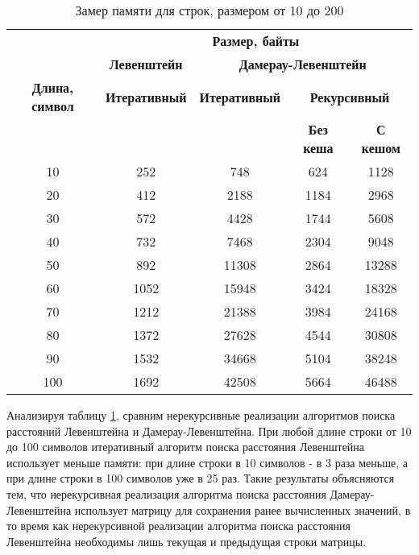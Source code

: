 \begin{table}[ht]
	\small
	\begin{center}
		\begin{threeparttable}
			\caption{Замер памяти для строк, размером от 10 до 200}
			\label{tbl:memory}
			\begin{tabular}{|c|c|c|c|c|}
				\hline
				& \multicolumn{4}{c|}{\bfseries Размер, байты} \\ \cline{2-5}
				& \multicolumn{1}{c|}{\bfseries Левенштейн}
				& \multicolumn{3}{c|}{\bfseries Дамерау-Левенштейн} \\ \cline{2-5}
				\bfseries Длина, символ & \bfseries Итеративный & \bfseries Итеративный & \multicolumn{2}{c|}{\bfseries Рекурсивный} \\ \cline{4-5}
				& & & \bfseries Без кеша & \bfseries С кешом \\
				\hline
				10 & 252 & 748 & 624 & 1128 \\
				\hline
				20 & 412 & 2188 & 1184 & 2968 \\
				\hline
				30 & 572 & 4428 & 1744 & 5608 \\
				\hline
				40 & 732 & 7468 & 2304 & 9048 \\
				\hline
				50 & 892 & 11308 & 2864 & 13288 \\
				\hline
				60 &  1052 & 15948 & 3424 & 18328 \\
				\hline
				70 & 1212 & 21388 & 3984 & 24168 \\
				\hline
				80 &1372 & 27628 & 4544 & 30808 \\
				\hline
				90 & 1532 & 34668 & 5104 &  38248 \\
				\hline
				100 & 1692 & 42508 & 5664 & 46488 \\
				\hline
			\end{tabular}	
		\end{threeparttable}
	\end{center}
\end{table}

%	


\clearpage

Анализируя таблицу \ref{tbl:memory}, сравним нерекурсивные реализации алгоритмов поиска расстояний Левенштейна и Дамерау-Левенштейна. При любой длине строки от 10 до 100 символов итеративный алгоритм поиска расстояния Левенштейна использует меньше памяти: при длине строки в 10 символов - в 3 раза меньше, а при длине строки в 100 символов уже в 25 раз. Такие результаты объясняются тем, что нерекурсивная реализация алгоритма поиска расстояния Дамерау-Левенштейна использует матрицу для сохранения ранее вычисленных значений, в то время как нерекурсивной реализации алгоритма поиска расстояния Левенштейна необходимы лишь текущая и предыдущая строки матрицы.

